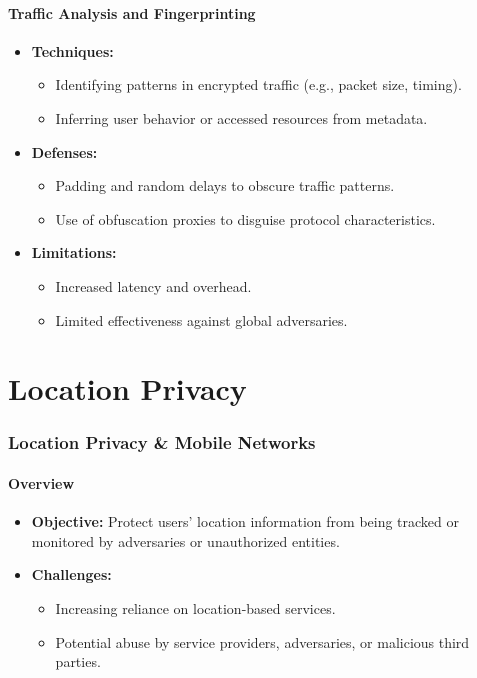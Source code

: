 \documentclass{article}
\begin{document}
\subsection{Traffic Analysis and Fingerprinting}
\begin{itemize}
    \item \textbf{Techniques:}
    \begin{itemize}
        \item Identifying patterns in encrypted traffic (e.g., packet size, timing).
        \item Inferring user behavior or accessed resources from metadata.
    \end{itemize}
    \item \textbf{Defenses:}
    \begin{itemize}
        \item Padding and random delays to obscure traffic patterns.
        \item Use of obfuscation proxies to disguise protocol characteristics.
    \end{itemize}
    \item \textbf{Limitations:}
    \begin{itemize}
        \item Increased latency and overhead.
        \item Limited effectiveness against global adversaries.
    \end{itemize}
\end{itemize}




\part{Location Privacy}
\section{Location Privacy \& Mobile Networks}

\subsection{Overview}
\begin{itemize}
    \item \textbf{Objective:} Protect users' location information from being tracked or monitored by adversaries or unauthorized entities.
    \item \textbf{Challenges:}
    \begin{itemize}
        \item Increasing reliance on location-based services.
        \item Potential abuse by service providers, adversaries, or malicious third parties.
    \end{itemize}
\end{itemize}
\end{document}
